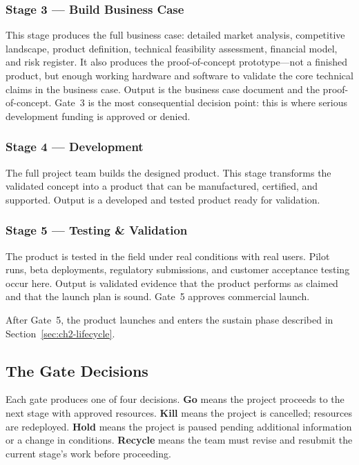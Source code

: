 \subsubsection{Stage 3 --- Build Business Case}
This stage produces the full business case: detailed market analysis,
competitive landscape, product definition, technical feasibility
assessment, financial model, and risk register.
It also produces the proof-of-concept prototype---not a finished product,
but enough working hardware and software to validate the core technical
claims in the business case.
Output is the business case document and the proof-of-concept.
Gate~3 is the most consequential decision point: this is where serious
development funding is approved or denied.

\subsubsection{Stage 4 --- Development}
The full project team builds the designed product.
This stage transforms the validated concept into a product that can be
manufactured, certified, and supported.
Output is a developed and tested product ready for validation.

\subsubsection{Stage 5 --- Testing \& Validation}
The product is tested in the field under real conditions with real users.
Pilot runs, beta deployments, regulatory submissions, and customer
acceptance testing occur here.
Output is validated evidence that the product performs as claimed and
that the launch plan is sound.
Gate~5 approves commercial launch.

After Gate~5, the product launches and enters the sustain phase described
in Section~\ref{sec:ch2-lifecycle}.

\subsection{The Gate Decisions}
\label{subsec:ch2-gates}

Each gate produces one of four decisions.
\textbf{Go} means the project proceeds to the next stage with approved
resources.
\textbf{Kill} means the project is cancelled; resources are redeployed.
\textbf{Hold} means the project is paused pending additional information
or a change in conditions.
\textbf{Recycle} means the team must revise and resubmit the current
stage's work before proceeding.

